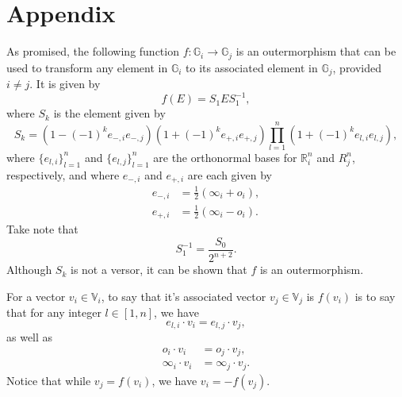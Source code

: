 \documentclass{birkjour}
\theoremstyle{definition}
\theoremstyle{remark}
\numberwithin{equation}{section}
\newcommand{\R}{\mathbb{R}}
\newcommand{\G}{\mathbb{G}}
\newcommand{\V}{\mathbb{V}}
\newcommand{\nvai}{\infty}
\newcommand{\nvao}{o}
\begin{document}
\section{Appendix}

As promised, the following function $f:\G_i\to\G_j$ is an outermorphism that can be used
to transform any element in $\G_i$ to its associated element in $\G_j$, provided $i\neq j$.
It is given by
\begin{equation*}
f(E) = S_1ES_1^{-1},
\end{equation*}
where $S_k$ is the element given by
\begin{equation*}
S_k = (1-(-1)^k e_{-,i}e_{-,j})(1+(-1)^k e_{+,i}e_{+,j})\prod_{l=1}^n(1+(-1)^k e_{l,i}e_{l,j}),
\end{equation*}
where $\{e_{l,i}\}_{l=1}^n$ and $\{e_{l,j}\}_{l=1}^n$ are the orthonormal bases for $\R_i^n$ and $R_j^n$, respectively,
and where $e_{-,i}$ and $e_{+,i}$ are each given by
\begin{align*}
e_{-,i} &= \frac{1}{2}(\nvai_i+\nvao_i),\\
e_{+,i} &= \frac{1}{2}(\nvai_i-\nvao_i).
\end{align*}
Take note that
\begin{equation*}
S_1^{-1} = \frac{S_0}{2^{n+2}}.
\end{equation*}
Although $S_k$ is not a versor, it can be shown that $f$ is an outermorphism.

For a vector $v_i\in\V_i$, to say that it's associated vector $v_j\in\V_j$ is $f(v_i)$ is to say
that for any integer $l\in[1,n]$, we have
\begin{equation*}
e_{l,i}\cdot v_i = e_{l,j}\cdot v_j,
\end{equation*}
as well as
\begin{align*}
\nvao_i\cdot v_i &= \nvao_j\cdot v_j,\\
\nvai_i\cdot v_i &= \nvai_j\cdot v_j.
\end{align*}
Notice that while $v_j=f(v_i)$, we have $v_i = -f(v_j)$.

\nocite{Milne12}


\end{document}
